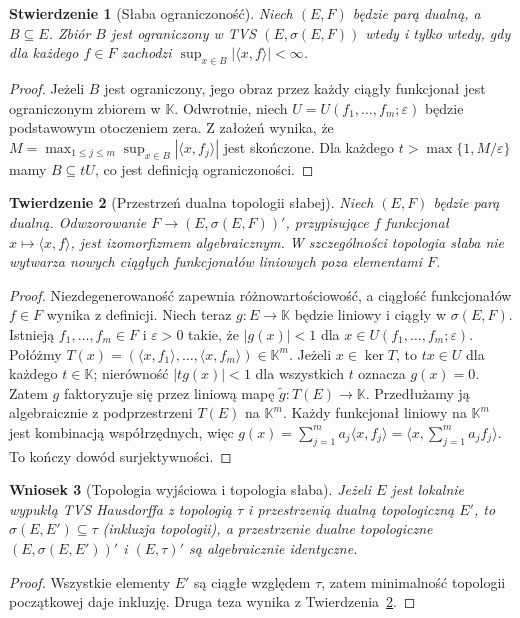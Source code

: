 \documentclass[11pt,a4paper]{article}
\numberwithin{equation}{section}
\theoremstyle{plain}
\newtheorem{twierdzenie}{Twierdzenie}[section]
\newtheorem{stwierdzenie}[twierdzenie]{Stwierdzenie}
\newtheorem{wniosek}[twierdzenie]{Wniosek}
\theoremstyle{definition}
\theoremstyle{remark}
\newcommand{\K}{\mathbb K}
\begin{document}
\begin{stwierdzenie}[Słaba ograniczoność]\label{prop:slaba-ograniczonosc}
Niech $(E,F)$ będzie parą dualną, a $B\subseteq E$.
Zbiór $B$ jest ograniczony w TVS $(E,\sigma(E,F))$
wtedy i tylko wtedy, gdy dla każdego $f\in F$
zachodzi $\sup_{x\in B}|\langle x,f\rangle|<\infty$.
\end{stwierdzenie}
\begin{proof}
Jeżeli $B$ jest ograniczony, jego obraz przez każdy ciągły
funkcjonał jest ograniczonym zbiorem w $\K$.
Odwrotnie, niech $U=U(f_1,\ldots,f_m;\varepsilon)$
będzie podstawowym otoczeniem zera. Z założeń wynika, że
$M=\max_{1\le j\le m}\sup_{x\in B}|\langle x,f_j\rangle|$
jest skończone. Dla każdego $t>\max\{1,M/\varepsilon\}$
mamy $B\subseteq tU$, co jest definicją ograniczoności.
\end{proof}

\begin{twierdzenie}[Przestrzeń dualna topologii słabej]\label{thm:slaby-dual}
Niech $(E,F)$ będzie parą dualną. Odwzorowanie
$F\to(E,\sigma(E,F))'$, przypisujące $f$ funkcjonał
$x\mapsto\langle x,f\rangle$, jest izomorfizmem
algebraicznym. W szczególności topologia słaba nie wytwarza
nowych ciągłych funkcjonałów liniowych poza elementami $F$.
\end{twierdzenie}
\begin{proof}
Niezdegenerowaność zapewnia różnowartościowość, a
ciągłość funkcjonałów $f\in F$ wynika z definicji.
Niech teraz $g:E\to\K$ będzie liniowy i ciągły w
$\sigma(E,F)$. Istnieją $f_1,\ldots,f_m\in F$
i $\varepsilon>0$ takie, że
$|g(x)|<1$ dla $x\in U(f_1,\ldots,f_m;\varepsilon)$.
Połóżmy $T(x)=(\langle x,f_1\rangle,\ldots,
\langle x,f_m\rangle)\in\K^m$. Jeżeli $x\in\ker T$,
to $tx\in U$ dla każdego $t\in\K$; nierówność
$|t g(x)|<1$ dla wszystkich $t$ oznacza $g(x)=0$.
Zatem $g$ faktoryzuje się przez liniową mapę
$\widetilde g:T(E)\to\K$. Przedłużamy ją algebraicznie
z podprzestrzeni $T(E)$ na $\K^m$. Każdy funkcjonał
liniowy na $\K^m$ jest kombinacją współrzędnych,
więc $g(x)=\sum_{j=1}^m a_j\langle x,f_j\rangle
=\langle x,\sum_{j=1}^m a_j f_j\rangle$.
To kończy dowód surjektywności.
\end{proof}

\begin{wniosek}[Topologia wyjściowa i topologia słaba]\label{cor:slaba-wyjsciowa}
Jeżeli $E$ jest lokalnie wypukłą TVS Hausdorffa z topologią
$\tau$ i przestrzenią dualną topologiczną $E'$, to
$\sigma(E,E')\subseteq\tau$ (inkluzja topologii),
a przestrzenie dualne topologiczne $(E,\sigma(E,E'))'$ i
$(E,\tau)'$ są algebraicznie identyczne.
\end{wniosek}
\begin{proof}
Wszystkie elementy $E'$ są ciągłe względem $\tau$,
zatem minimalność topologii początkowej daje inkluzję.
Druga teza wynika z Twierdzenia~\ref{thm:slaby-dual}.
\end{proof}
\end{document}
